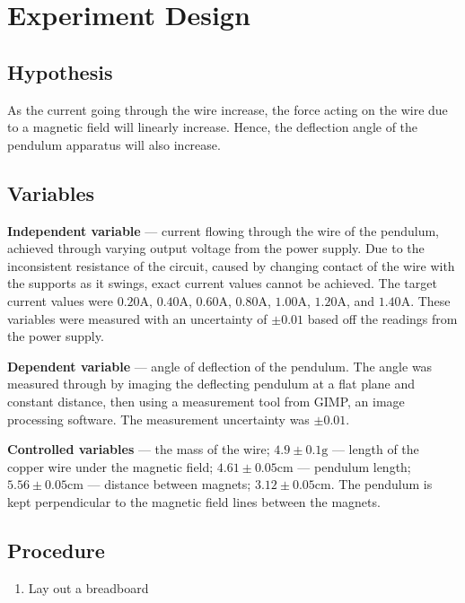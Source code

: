 \section*{Experiment Design}

\subsection*{Hypothesis}

As the current going through the wire increase, the force acting on the wire due to a magnetic field will linearly increase. Hence, the deflection angle of the pendulum apparatus will also increase.

\subsection*{Variables}

\textbf{Independent variable} --- current flowing through the wire of the pendulum, achieved through varying output voltage from the power supply.
Due to the inconsistent resistance of the circuit, caused by changing contact of the wire with the supports as it swings, exact current values cannot be achieved.
The target current values were $0.20\si{\ampere}$, $0.40\si{\ampere}$, $0.60\si{\ampere}$, $0.80\si{\ampere}$, $1.00\si{\ampere}$, $1.20\si{\ampere}$, and $1.40\si{\ampere}$.
These variables were measured with an uncertainty of $\pm0.01$ based off the readings from the power supply.

\textbf{Dependent variable} --- angle of deflection of the pendulum. The angle was measured through by imaging the deflecting pendulum at a flat plane and constant distance, then using a measurement tool from GIMP, an image processing software. The measurement uncertainty was $\pm0.01$.

\textbf{Controlled variables} --- the mass of the wire; $4.9\pm0.1\si{\gram}$ --- length of the copper wire under the magnetic field; $4.61\pm0.05\si{\centi\meter}$ --- pendulum length; $5.56\pm0.05\si{\centi\meter}$ --- distance between magnets; $3.12\pm0.05\si{\centi\meter}$.
The pendulum is kept perpendicular to the magnetic field lines between the magnets.

\subsection*{Procedure}

\begin{enumerate}
	\item Lay out a breadboard 
\end{enumerate}

